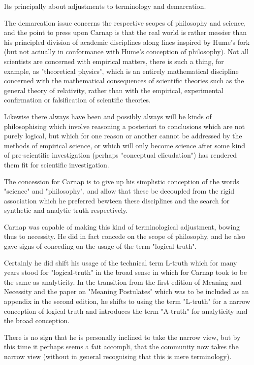 \documentclass[10pt,titlepage]{book}
\begin{document}
Its principally about adjustments to terminology and demarcation.

The demarcation issue concerns the respective scopes of philosophy and science, and the point to press upon Carnap is that the real world is rather messier than his principled division of academic disciplines along lines inspired by Hume's fork (but not actually in conformance with Hume's conception of philosophy).  Not all scientists are concerned with empirical matters, there is such a thing, for example, as "theoretical physics", which is an entirely mathematical discipline concerned with the mathematical consequences of scientific theories such as the general theory of relativity, rather than with the empirical, experimental confirmation or falsification of scientific theories.

Likewise there always have been and possibly always will be kinds of philosophising which involve reasoning a posteriori to conclusions which are not purely logical, but which for one reason or another cannot be addressed by the methods of empirical science, or which will only become science after some kind of pre-scientific investigation (perhaps "conceptual elicudation") has rendered them fit for scientific investigation.

The concession for Carnap is to give up his simplistic conception of the words "science" and "philosophy", and allow that these be decoupled from the rigid association which he preferred bewteen these disciplines and the search for synthetic and analytic truth respectively.

Carnap was capable of making this kind of terminological adjustment, bowing thus to necessity.  He did in fact concede on the scope of philosophy, and he also gave signs of conceding on the usage of the term "logical truth".

Certainly he did shift his usage of the technical term L-truth which for many years stood for "logical-truth" in the broad sense in which for Carnap took to be the same as analyticity.  In the transition from the first edition of Meaning and Necessity and the paper on "Meaning Postulates" which was to be included as an appendix in the second edition, he shifts to using the term "L-truth" for a narrow conception of logical truth and introduces the term "A-truth" for analyticity and the broad conception.

There is no sign that he is personally inclined to take the narrow view, but by this time it perhaps seems a fait accompli, that the community now takes tbe narrow view (without in general recognising that this is mere terminology).
\end{document}
